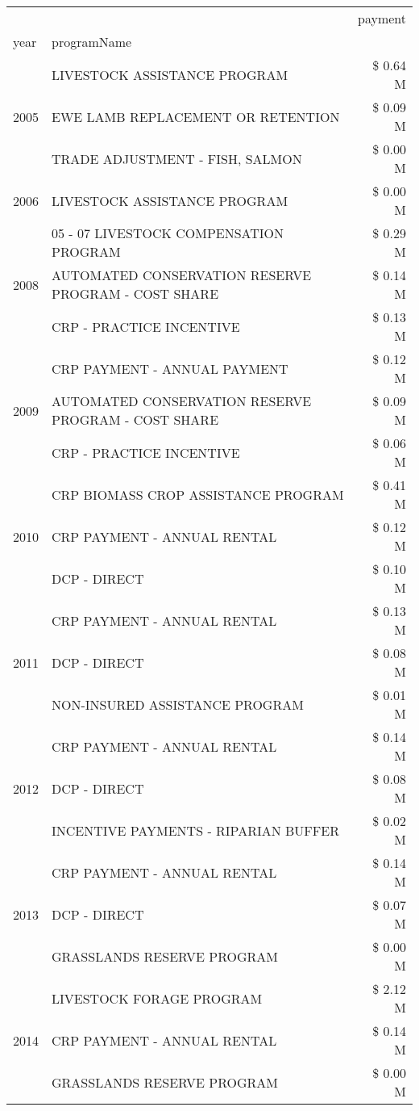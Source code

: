 \begin{tabular}{llr}
\toprule
 &  & payment \\
year & programName &  \\
\midrule
\multirow[t]{3}{*}{2005} & LIVESTOCK ASSISTANCE PROGRAM & \$ 0.64 M \\
 & EWE LAMB REPLACEMENT OR RETENTION & \$ 0.09 M \\
 & TRADE ADJUSTMENT - FISH, SALMON & \$ 0.00 M \\
\cline{1-3}
2006 & LIVESTOCK ASSISTANCE PROGRAM & \$ 0.00 M \\
\cline{1-3}
\multirow[t]{3}{*}{2008} & 05 - 07 LIVESTOCK COMPENSATION PROGRAM & \$ 0.29 M \\
 & AUTOMATED CONSERVATION RESERVE PROGRAM - COST SHARE & \$ 0.14 M \\
 & CRP - PRACTICE INCENTIVE & \$ 0.13 M \\
\cline{1-3}
\multirow[t]{3}{*}{2009} & CRP PAYMENT - ANNUAL PAYMENT & \$ 0.12 M \\
 & AUTOMATED CONSERVATION RESERVE PROGRAM - COST SHARE & \$ 0.09 M \\
 & CRP - PRACTICE INCENTIVE & \$ 0.06 M \\
\cline{1-3}
\multirow[t]{3}{*}{2010} & CRP BIOMASS CROP ASSISTANCE PROGRAM & \$ 0.41 M \\
 & CRP PAYMENT - ANNUAL RENTAL & \$ 0.12 M \\
 & DCP - DIRECT & \$ 0.10 M \\
\cline{1-3}
\multirow[t]{3}{*}{2011} & CRP PAYMENT - ANNUAL RENTAL & \$ 0.13 M \\
 & DCP - DIRECT & \$ 0.08 M \\
 & NON-INSURED ASSISTANCE PROGRAM & \$ 0.01 M \\
\cline{1-3}
\multirow[t]{3}{*}{2012} & CRP PAYMENT - ANNUAL RENTAL & \$ 0.14 M \\
 & DCP - DIRECT & \$ 0.08 M \\
 & INCENTIVE PAYMENTS - RIPARIAN BUFFER & \$ 0.02 M \\
\cline{1-3}
\multirow[t]{3}{*}{2013} & CRP PAYMENT - ANNUAL RENTAL & \$ 0.14 M \\
 & DCP - DIRECT & \$ 0.07 M \\
 & GRASSLANDS RESERVE PROGRAM & \$ 0.00 M \\
\cline{1-3}
\multirow[t]{3}{*}{2014} & LIVESTOCK FORAGE PROGRAM & \$ 2.12 M \\
 & CRP PAYMENT - ANNUAL RENTAL & \$ 0.14 M \\
 & GRASSLANDS RESERVE PROGRAM & \$ 0.00 M \\

\end{tabular}

